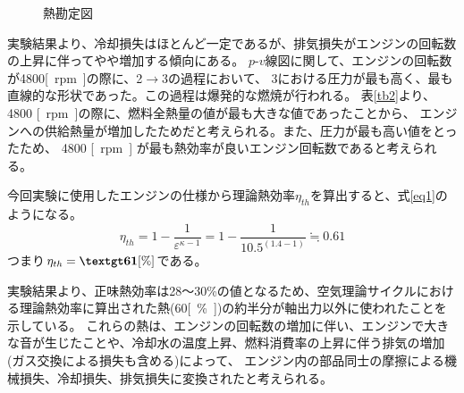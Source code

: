 \begin{figure}[h]
  \begin{center}
  \caption{熱勘定図}
  \end{center}
\end{figure}
\label{kanjou}

\clearpage

実験結果より、冷却損失はほとんど一定であるが、排気損失がエンジンの回転数の上昇に伴ってやや増加する傾向にある。
$p$-$v$線図に関して、エンジンの回転数が4800\si{[rpm]}の際に、2$\rightarrow$3の過程において、
3における圧力が最も高く、最も直線的な形状であった。この過程は爆発的な燃焼が行われる。
表\ref{tb2}より、4800 \si{[rpm]}の際に、燃料全熱量の値が最も大きな値であったことから、
エンジンへの供給熱量が増加したためだと考えられる。また、圧力が最も高い値をとったため、
4800 \si{[rpm]} が最も熱効率が良いエンジン回転数であると考えられる。

今回実験に使用したエンジンの仕様から理論熱効率$\eta_{th}$を算出すると、式\eqref{eq1}のようになる。
\begin{equation}
  \eta_{th} = 1-\frac{1}{\varepsilon^{\kappa-1}}=1-\frac{1}{10.5^{(1.4-1)}}\fallingdotseq 0.61
  \label{eq1}
\end{equation}
つまり$\eta_{th}=\tsuyo{61\si{[\%]}}$である。


実験結果より、正味熱効率は28～30\%の値となるため、空気理論サイクルにおける理論熱効率に算出された熱(60\si{[\%]})の約半分が軸出力以外に使われたことを示している。
これらの熱は、エンジンの回転数の増加に伴い、エンジンで大きな音が生じたことや、冷却水の温度上昇、燃料消費率の上昇に伴う排気の増加(ガス交換による損失も含める)によって、
エンジン内の部品同士の摩擦による機械損失、冷却損失、排気損失に変換されたと考えられる。

